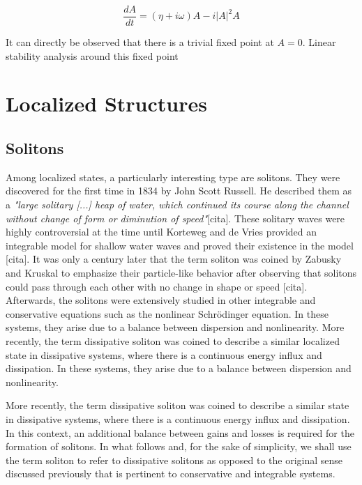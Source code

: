 \begin{equation}
    \dfrac{dA}{dt} = (\eta + i\omega)A - i|A|^2 A
\end{equation}

It can directly be observed that there is a trivial fixed point at $A=0$. Linear stability analysis around this fixed point 


\section{Localized Structures}
\label{sec:fra_LS}

\subsection{Solitons}

Among localized states, a particularly interesting type are solitons. They were discovered
 for the first time in 1834 by John Scott Russell. He described them 
 as a {\em "large solitary [...] heap of water, which continued its course along the channel without change of form
or diminution of speed"}[cita]. These solitary waves were highly controversial
at the time until Korteweg and de Vries provided an integrable model for shallow water waves
and proved their existence in the model [cita].
It was only a century later that the term soliton was coined by Zabusky and Kruskal
to emphasize their particle-like behavior after observing that solitons could pass through each
other with no change in shape or speed [cita]. Afterwards, the solitons were extensively studied
in other integrable and conservative equations such as the nonlinear Schrödinger
equation. In these systems, they arise due to a balance between dispersion and nonlinearity. 
More recently, the term dissipative soliton was coined to describe a similar localized state
in dissipative systems, where there is a continuous energy influx and dissipation. 
In these systems, they arise due to a balance between dispersion and nonlinearity. 


More recently, the term dissipative soliton was coined to describe a similar state
in dissipative systems, where there is a continuous energy influx and dissipation. 
In this context, an additional balance between gains and losses is required for the formation
of solitons. In what follows and, for the sake of simplicity, we shall use the term soliton
to refer to dissipative solitons as opposed to the original sense discussed previously
that is pertinent to conservative and integrable systems.



